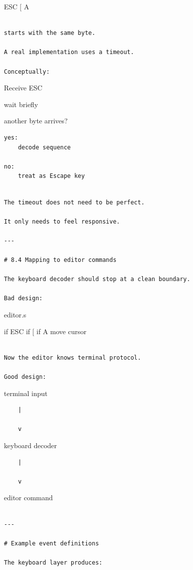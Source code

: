 \documentclass[
  oneside,
  openany]{book}
\begin{document}
ESC {[} A

\begin{verbatim}

starts with the same byte.

A real implementation uses a timeout.

Conceptually:
\end{verbatim}

Receive ESC

wait briefly

another byte arrives?

\begin{verbatim}
yes:
    decode sequence

no:
    treat as Escape key
\end{verbatim}

\begin{verbatim}

The timeout does not need to be perfect.

It only needs to feel responsive.

---

# 8.4 Mapping to editor commands

The keyboard decoder should stop at a clean boundary.

Bad design:
\end{verbatim}

editor.s

if ESC if {[} if A move cursor

\begin{verbatim}

Now the editor knows terminal protocol.

Good design:
\end{verbatim}

terminal input

\begin{verbatim}
    |

    v
\end{verbatim}

keyboard decoder

\begin{verbatim}
    |

    v
\end{verbatim}

editor command

\begin{verbatim}

---

# Example event definitions

The keyboard layer produces:
\end{verbatim}
\end{document}
